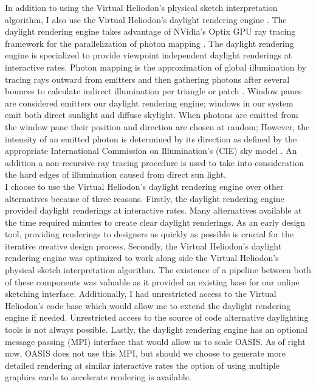 In addition to using the Virtual Heliodon's physical sketch interpretation algorithm, I also use the Virtual Heliodon's daylight rendering engine \cite{li2011photon,nasman2013physical}.  The daylight rendering engine takes advantage of NVidia's Optix GPU ray tracing framework for the parallelization of photon mapping \cite{parker2010optix}.  The daylight rendering engine is specialized to provide viewpoint independent daylight renderings at interactive rates.  Photon mapping is the approximation of global illumination by tracing rays outward from emitters and then gathering photons after several bounces to calculate indirect illumination per triangle or patch \cite{hachisuka2008progressive}.  Window panes are considered emitters our daylight rendering engine; windows in our system emit both direct sunlight and diffuse skylight.  When photons are emitted from the window pane their position and direction are chosen at random; However, the intensity of an emitted photon is determined by its direction as defined by the appropriate International Commission on Illumination's (CIE) sky model \cite{matsuura1988luminance}.  An addition a non-recursive ray tracing procedure is used to take into consideration the hard edges of illumination caused from direct sun light. \\

I choose to use the Virtual Heliodon's daylight rendering engine over other alternatives because of three reasons.  Firstly, the daylight rendering engine provided daylight renderings at interactive rates. Many alternatives available at the time required minutes to create clear daylight renderings. As an early design tool, providing renderings to designers as quickly as possible is crucial for the iterative creative design process.  Secondly, the Virtual Heliodon's daylight rendering engine was optimized to work along side the Virtual Heliodon's physical sketch interpretation algorithm. The existence of a pipeline between both of these components was valuable as it provided an existing base for our online sketching interface. Additionally, I had unrestricted access to the Virtual Heliodon's code base which would allow me to extend the daylight rendering engine if needed. Unrestricted access to the source of code alternative daylighting tools is not always possible.  Lastly, the daylight rendering engine has an optional message passing (MPI) interface that would allow us to scale OASIS. As of right now, OASIS does not use this MPI, but should we choose to generate more detailed rendering at similar interactive rates the option of using multiple graphics cards to accelerate rendering is available. \\

